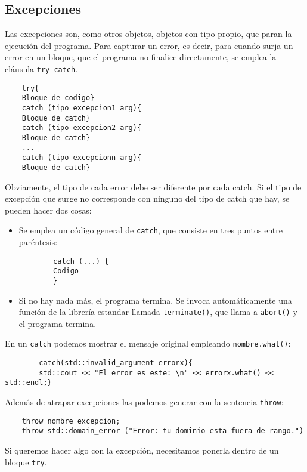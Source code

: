 \documentclass[a4paper]{article}
\begin{document}
	\subsection{Excepciones}
	Las excepciones son, como otros objetos, objetos con tipo propio, que paran la ejecución del programa. Para capturar un error, es decir, para cuando surja un error en un bloque, que el programa no finalice directamente, se emplea la cláusula \verb|try-catch|.
	\begin{lstlisting}
	try{
	Bloque de codigo}
	catch (tipo excepcion1 arg){
	Bloque de catch}
	catch (tipo excepcion2 arg){
	Bloque de catch}
	...
	catch (tipo excepcionn arg){
	Bloque de catch}
	\end{lstlisting}
	
	Obviamente, el tipo de cada error debe ser diferente por cada catch. Si el tipo de excepción que surge no corresponde con ninguno del tipo de catch que hay, se pueden hacer dos cosas:
	\begin{itemize}
		\item Se emplea un código general de \verb|catch|, que consiste en tres puntos entre paréntesis:
		\begin{lstlisting}
		catch (...) {
		Codigo
		}
		\end{lstlisting}
		\item Si no hay nada más, el programa termina. Se invoca automáticamente una función de la librería estandar llamada \verb|terminate()|, que llama a \verb|abort()| y el programa termina.
	\end{itemize}
		En un \verb|catch| podemos mostrar el mensaje original empleando \verb|nombre.what()|:
		\begin{lstlisting}
		catch(std::invalid_argument errorx){
		std::cout << "El error es este: \n" << errorx.what() << std::endl;}
		\end{lstlisting}
		

	Además de atrapar excepciones las podemos generar con la sentencia \verb|throw|:
	\begin{lstlisting}
	throw nombre_excepcion;
	throw std::domain_error ("Error: tu dominio esta fuera de rango.")
	\end{lstlisting}
	Si queremos hacer algo con la excepción, necesitamos ponerla dentro de un bloque \verb|try|.
	
\end{document}
